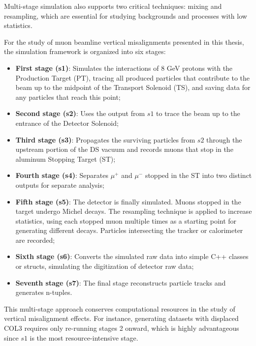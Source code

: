 Multi-stage simulation also supports two critical techniques: mixing and resampling, which are essential for studying backgrounds and processes with low statistics.

For the study of muon beamline vertical misalignments presented in this thesis, the simulation framework is organized into six stages:

\begin{itemize}
    \item \textbf{First stage (s1)}: Simulates the interactions of 
    8 GeV protons with the Production Target (PT), tracing all produced 
    particles that contribute to the beam up to the midpoint of the Transport 
    Solenoid (TS), and saving data for any particles that reach this point;
    \item \textbf{Second stage (s2)}: Uses the output from $s1$ to trace the 
    beam up to the entrance of the Detector Solenoid;
    \item \textbf{Third stage (s3)}: Propagates the surviving particles 
    from $s2$ through the upstream portion of the DS vacuum and records 
    muons that stop in the aluminum Stopping Target (ST);
    \item \textbf{Fourth stage (s4)}: Separates $\mu^+$ and $\mu^-$ 
    stopped in the ST into two distinct outputs for separate analysis;
    \item \textbf{Fifth stage (s5)}: The detector is finally simulated. 
    Muons stopped in the target undergo Michel decays. The resampling 
    technique is applied to increase statistics, using each stopped 
    muon multiple times as a starting point for generating different 
    decays. Particles intersecting the tracker or calorimeter are recorded;
    \item \textbf{Sixth stage (s6)}: Converts the simulated raw data into 
    simple C++ classes or structs, simulating the digitization of detector raw data;
    \item \textbf{Seventh stage (s7)}: The final stage reconstructs particle tracks and generates n-tuples.
\end{itemize}

This multi-stage approach conserves computational resources in the study of vertical 
misalignment effects. For instance, generating datasets with displaced COL3 requires 
only re-running stages 2 onward, which is highly advantageous since $s1$ is the most 
resource-intensive stage.
